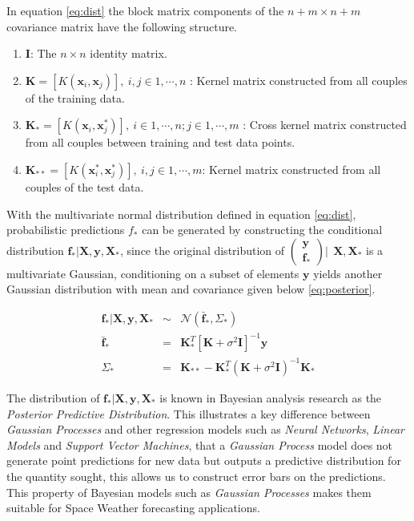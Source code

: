 \documentclass[referee,a4paper,12pt,traditabstract]{swsc}
\begin{document}
\begin{linenumbers}
In equation \ref{eq:dist} the block matrix components of the $n+m \times n+m$ covariance matrix have the following structure.

\begin{enumerate}
      \item $\mathbf{I}$: The $n \times n$ identity matrix.
      \item $\mathbf{K} = [K(\mathbf{x}_i, \mathbf{x}_j)], \ i,j \in 1,\cdots,n$ : Kernel matrix constructed from all couples of the training data.
      \item $\mathbf{K}_{*} = [K(\mathbf{x}_i, \mathbf{x}^{*}_j)], \ i \in 1,\cdots,n ; j \in 1,\cdots,m$ : Cross kernel matrix constructed from all couples between training and test data points.
      \item $\mathbf{K}_{**} = [K(\mathbf{x}^{*}_i, \mathbf{x}^{*}_j)], \ i,j \in 1,\cdots,m$: Kernel matrix constructed from all couples of the test data.
\end{enumerate}

With the multivariate normal distribution defined in equation \ref{eq:dist}, probabilistic predictions $f_*$ can be generated by constructing the conditional distribution $\mathbf{f_*}|\mathbf{X},\mathbf{y},\mathbf{X_*}$, since the original distribution of $\left( \begin{array}{c} \mathbf{y} \\ \mathbf{f_*} \end{array} \right) | \ \ \mathbf{X}, \mathbf{X}_*$ is a multivariate Gaussian, conditioning on a subset of elements $\mathbf{y}$ yields another Gaussian distribution with mean and covariance given below \ref{eq:posterior}.

\begin{eqnarray}
    \mathbf{f_*}|\mathbf{X},\mathbf{y},\mathbf{X_*} & \sim & \mathcal{N}(\mathbf{\bar{f}_*}, \Sigma_*)  \label{eq:posterior} \\
    \mathbf{\bar{f}_*} & = & \mathbf{K}^T_{*} [\mathbf{K} + \sigma^{2} \mathbf{I}]^{-1} \mathbf{y} \label{eq:posteriormean} \\
    \Sigma_* & = & \mathbf{K}_{**} - \mathbf{K}^T_{*} \left(\mathbf{K} + \sigma^{2} \mathbf{I}\right)^{-1} \mathbf{K}_{*} \label{eq:posteriorcov}
\end{eqnarray}

The distribution of $\mathbf{f_*}| \mathbf{X},\mathbf{y},\mathbf{X_*}$ is known in Bayesian analysis research as the \emph{Posterior Predictive Distribution}. This illustrates a key difference between \emph{Gaussian Processes} and other regression models such as \emph{Neural Networks}, \emph{Linear Models} and \emph{Support Vector Machines}, that a \emph{Gaussian Process} model does not generate point predictions for new data but outputs a predictive distribution for the quantity sought, this allows us to construct error bars on the predictions. This property of Bayesian models such as \emph{Gaussian Processes} makes them suitable for Space Weather forecasting applications. 


\end{linenumbers}
\end{document}
